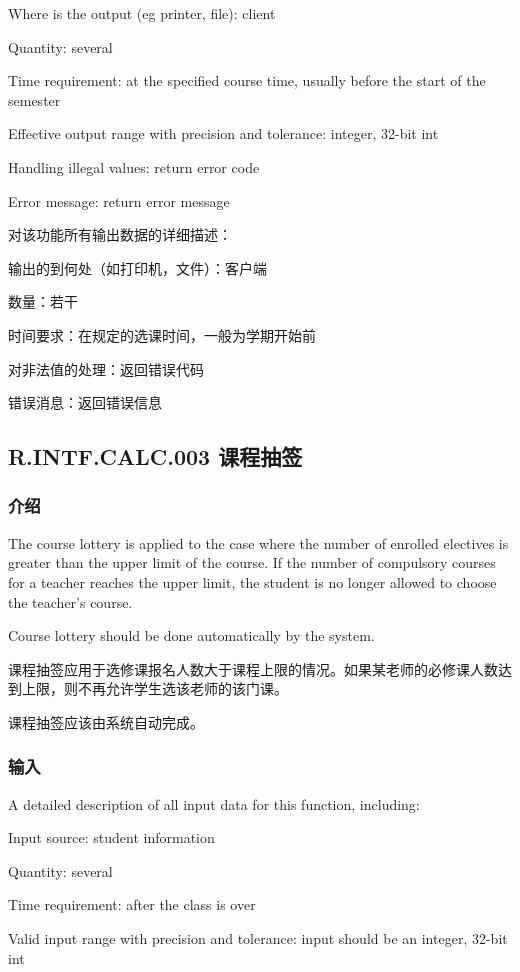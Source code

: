 Where is the output (eg printer, file): client

Quantity: several

Time requirement: at the specified course time, usually before the start of the semester

Effective output range with precision and tolerance: integer, 32-bit int

Handling illegal values: return error code

Error message: return error message

对该功能所有输出数据的详细描述：

	输出的到何处（如打印机，文件）：客户端

	数量：若干

	时间要求：在规定的选课时间，一般为学期开始前

	对非法值的处理：返回错误代码

	错误消息：返回错误信息
	

\subsection{R.INTF.CALC.003 课程抽签}
\subsubsection{介绍}
The course lottery is applied to the case where the number of enrolled electives is greater than the upper limit of the course. If the number of compulsory courses for a teacher reaches the upper limit, the student is no longer allowed to choose the teacher's course.

Course lottery should be done automatically by the system.

课程抽签应用于选修课报名人数大于课程上限的情况。如果某老师的必修课人数达到上限，则不再允许学生选该老师的该门课。

课程抽签应该由系统自动完成。

\subsubsection{输入}
A detailed description of all input data for this function, including:

Input source: student information

Quantity: several

Time requirement: after the class is over

Valid input range with precision and tolerance: input should be an integer, 32-bit int

